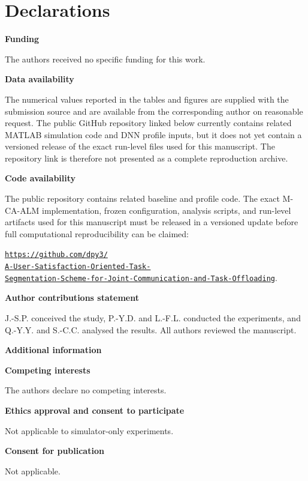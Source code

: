 \documentclass[pdflatex,sn-mathphys-num]{sn-jnl}
\newcommand{\GitHubURL}{%
  \href{https://github.com/dpy3/A-User-Satisfaction-Oriented-Task-Segmentation-Scheme-for-Joint-Communication-and-Task-Offloading/tree/main/Cluster_Computing_Reproducibility_2026-10-15}{\texttt{https://github.com/dpy3/}}\\[-0.15em]
  \href{https://github.com/dpy3/A-User-Satisfaction-Oriented-Task-Segmentation-Scheme-for-Joint-Communication-and-Task-Offloading/tree/main/Cluster_Computing_Reproducibility_2026-10-15}{\texttt{A-User-Satisfaction-Oriented-Task-}}\\[-0.15em]
  \href{https://github.com/dpy3/A-User-Satisfaction-Oriented-Task-Segmentation-Scheme-for-Joint-Communication-and-Task-Offloading/tree/main/Cluster_Computing_Reproducibility_2026-10-15}{\texttt{Segmentation-Scheme-for-Joint-Communication-and-Task-Offloading}}}
\begin{document}

\backmatter
\section*{Declarations}
\noindent\textbf{Funding}\par
The authors received no specific funding for this work.
\par\medskip

\noindent\textbf{Data availability}\par
The numerical values reported in the tables and figures are supplied with the
submission source and are available from the corresponding author on reasonable
request. The public GitHub repository linked below currently contains related
MATLAB simulation code and DNN profile inputs, but it does not yet contain a
versioned release of the exact run-level files used for this manuscript. The
repository link is therefore not presented as a complete reproduction archive.
\par\medskip

\noindent\textbf{Code availability}\par
The public repository contains related baseline and profile code. The exact
M-CA-ALM implementation, frozen configuration, analysis scripts, and run-level
artifacts used for this manuscript must be released in a versioned update before
full computational reproducibility can be claimed:\par
\GitHubURL.
\par\medskip

\noindent\textbf{Author contributions statement}\par
J.-S.P. conceived the study, P.-Y.D. and L.-F.L. conducted the experiments, and Q.-Y.Y. and S.-C.C. analysed the results. All authors reviewed the manuscript.
\par\medskip

\noindent\textbf{Additional information}\par
\noindent\textbf{Competing interests}\par
The authors declare no competing interests.
\par\medskip

\noindent\textbf{Ethics approval and consent to participate}\par
Not applicable to simulator-only experiments.
\par\medskip

\noindent\textbf{Consent for publication}\par
Not applicable.


\end{document}
